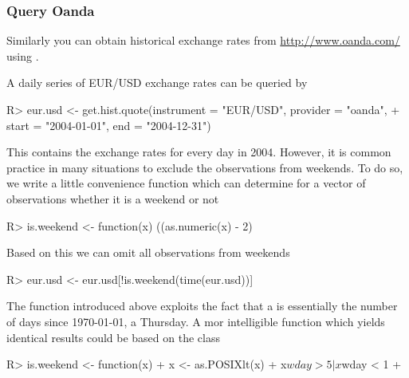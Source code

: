 \documentclass{Z}
\newcommand{\mysection}[1]{\subsubsection[#1]{\textbf{#1}}}
\begin{document}
\mysection{Query Oanda}

Similarly you can obtain historical exchange rates from \url{http://www.oanda.com/}
using .

A daily series of EUR/USD exchange rates can be queried by
\begin{Schunk}
\begin{Sinput}
R> eur.usd <- get.hist.quote(instrument = "EUR/USD", provider = "oanda", 
+     start = "2004-01-01", end = "2004-12-31")
\end{Sinput}
\end{Schunk}

This contains the exchange rates for every day in 2004. However, it is common practice
in many situations to exclude the observations from weekends. To do so, we
write a little convenience function which can determine for a vector of 
observations whether it is a weekend or not

\begin{Schunk}
\begin{Sinput}
R> is.weekend <- function(x) ((as.numeric(x) - 2)%%7) < 2
\end{Sinput}
\end{Schunk}

Based on this we can omit all observations from weekends
\begin{Schunk}
\begin{Sinput}
R> eur.usd <- eur.usd[!is.weekend(time(eur.usd))]
\end{Sinput}
\end{Schunk}

The function  introduced above exploits the fact that a 
is essentially the number of days since 1970-01-01, a Thursday. A mor intelligible
function which yields identical results could be based on the  class

\begin{Schunk}
\begin{Sinput}
R> is.weekend <- function(x) {
+     x <- as.POSIXlt(x)
+     x$wday > 5 | x$wday < 1
+ }
\end{Sinput}
\end{Schunk}


\end{document}

